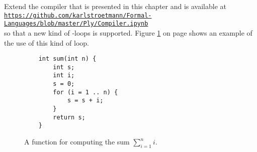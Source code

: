 \vspace*{\fill}
\pagebreak

\vspace*{\fill}
\pagebreak

\exerciseEng
Extend the compiler that is presented in this chapter and is available at
\\[0.2cm]
\hspace*{1.3cm}
\href{https://github.com/karlstroetmann/Formal-Languages/blob/master/Ply/Compiler.ipynb}{\texttt{https://github.com/karlstroetmann/Formal-Languages/blob/master/Ply/Compiler.ipynb}}
\\[0.2cm]
so that a new kind of -loops is supported.
Figure \ref{fig:MySum.c3} on page \pageref{fig:MySum.c3} shows an example of the use of this kind of
 loop. 
\eox

\begin{figure}[!ht]
\centering
\begin{verbatim}
    int sum(int n) {
        int s;
        int i;
        s = 0;
        for (i = 1 .. n) {
            s = s + i;
        }
        return s;
    }
\end{verbatim}
\vspace*{-0.3cm}
\caption{A function for computing the sum $\sum\limits_{i=1}^{n}i$.}
\label{fig:MySum.c3}
\end{figure}


